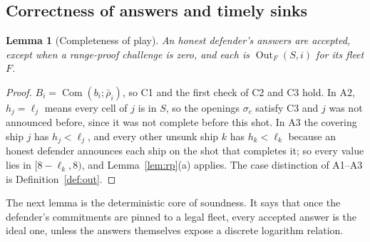 \documentclass[11pt]{article}
\newtheorem{lemma}{Lemma}[section]
\theoremstyle{definition}
\theoremstyle{remark}
\newcommand{\Com}{\operatorname{Com}}
\newcommand{\Out}{\operatorname{Out}}
\begin{document}
\subsection{Correctness of answers and timely sinks}\label{sec:timely}
\begin{lemma}[Completeness of play]\label{lem:play-complete}
An honest defender's answers are accepted, except when a range-proof challenge is zero, and each is $\Out_F(S,i)$ for its fleet $F$.
\end{lemma}
\begin{proof}
$B_i=\Com(b_i;\bar\rho_i)$, so C1 and the first check of C2 and C3 hold. In A2, $h_j=\ell_j$ means every cell of $j$ is in $S$, so the openings $\sigma_c$ satisfy C3 and $j$ was not announced before, since it was not complete before this shot. In A3 the covering ship $j$ has $h_j<\ell_j$, and every other unsunk ship $k$ has $h_k<\ell_k$ because an honest defender announces each ship on the shot that completes it; so every value lies in $[8-\ell_k,8)$, and Lemma~\ref{lem:rp}(a) applies. The case distinction of A1--A3 is Definition~\ref{def:out}.
\end{proof}

The next lemma is the deterministic core of soundness. It says that once the defender's commitments are pinned to a legal fleet, every accepted answer is the ideal one, unless the answers themselves expose a discrete logarithm relation.
\end{document}
